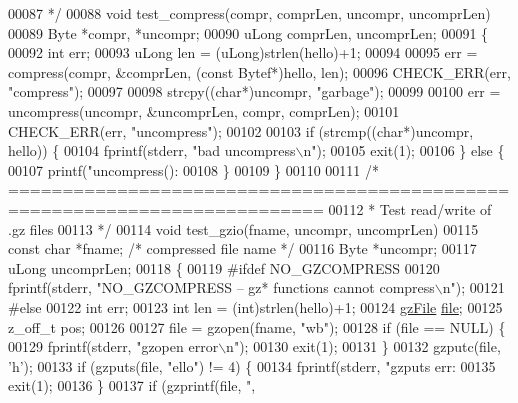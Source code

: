 \begin{DoxyCode}
{00087 \textcolor{comment}{ */}
00088 \textcolor{keywordtype}{void} test\_compress(compr, comprLen, uncompr, uncomprLen)
00089     Byte *compr, *uncompr;
00090     uLong comprLen, uncomprLen;
00091 \{
00092     \textcolor{keywordtype}{int} err;
00093     uLong len = (uLong)strlen(hello)+1;
00094 
00095     err = compress(compr, &comprLen, (\textcolor{keyword}{const} Bytef*)hello, len);
00096     CHECK\_ERR(err, \textcolor{stringliteral}{"compress"});
00097 
00098     strcpy((\textcolor{keywordtype}{char}*)uncompr, \textcolor{stringliteral}{"garbage"});
00099 
00100     err = uncompress(uncompr, &uncomprLen, compr, comprLen);
00101     CHECK\_ERR(err, \textcolor{stringliteral}{"uncompress"});
00102 
00103     \textcolor{keywordflow}{if} (strcmp((\textcolor{keywordtype}{char}*)uncompr, hello)) \{
00104         fprintf(stderr, \textcolor{stringliteral}{"bad uncompress\(\backslash\)n"});
00105         exit(1);
00106     \} \textcolor{keywordflow}{else} \{
00107         printf(\textcolor{stringliteral}{"uncompress(): %
00108     \}
00109 \}
00110 
00111 \textcolor{comment}{/* ===========================================================================}
00112 \textcolor{comment}{ * Test read/write of .gz files}
00113 \textcolor{comment}{ */}
00114 \textcolor{keywordtype}{void} test\_gzio(fname, uncompr, uncomprLen)
00115     \textcolor{keyword}{const} \textcolor{keywordtype}{char} *fname; \textcolor{comment}{/* compressed file name */}
00116     Byte *uncompr;
00117     uLong uncomprLen;
00118 \{
00119 \textcolor{preprocessor}{#ifdef NO\_GZCOMPRESS}
00120     fprintf(stderr, \textcolor{stringliteral}{"NO\_GZCOMPRESS -- gz* functions cannot compress\(\backslash\)n"});
00121 \textcolor{preprocessor}{#else}
00122     \textcolor{keywordtype}{int} err;
00123     \textcolor{keywordtype}{int} len = (int)strlen(hello)+1;
00124     \hyperlink{structgz_file__s}{gzFile} \hyperlink{structfile}{file};
00125     z\_off\_t pos;
00126 
00127     file = gzopen(fname, \textcolor{stringliteral}{"wb"});
00128     \textcolor{keywordflow}{if} (file == NULL) \{
00129         fprintf(stderr, \textcolor{stringliteral}{"gzopen error\(\backslash\)n"});
00130         exit(1);
00131     \}
00132     gzputc(file, \textcolor{charliteral}{'h'});
00133     \textcolor{keywordflow}{if} (gzputs(file, \textcolor{stringliteral}{"ello"}) != 4) \{
00134         fprintf(stderr, \textcolor{stringliteral}{"gzputs err: %
00135         exit(1);
00136     \}
00137     \textcolor{keywordflow}{if} (gzprintf(file, \textcolor{stringliteral}{", %
}}}}
\end{DoxyCode}
